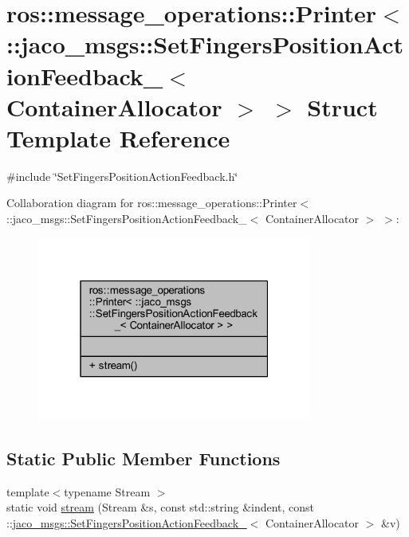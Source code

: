 \hypertarget{structros_1_1message__operations_1_1Printer_3_01_1_1jaco__msgs_1_1SetFingersPositionActionFeedbae13e05216e53f9116f074ec65036b29d}{}\section{ros\+:\+:message\+\_\+operations\+:\+:Printer$<$ \+:\+:jaco\+\_\+msgs\+:\+:Set\+Fingers\+Position\+Action\+Feedback\+\_\+$<$ Container\+Allocator $>$ $>$ Struct Template Reference}
\label{structros_1_1message__operations_1_1Printer_3_01_1_1jaco__msgs_1_1SetFingersPositionActionFeedbae13e05216e53f9116f074ec65036b29d}


{\ttfamily \#include \char`\"{}Set\+Fingers\+Position\+Action\+Feedback.\+h\char`\"{}}



Collaboration diagram for ros\+:\+:message\+\_\+operations\+:\+:Printer$<$ \+:\+:jaco\+\_\+msgs\+:\+:Set\+Fingers\+Position\+Action\+Feedback\+\_\+$<$ Container\+Allocator $>$ $>$\+:
\nopagebreak
\begin{figure}[H]
\begin{center}
\leavevmode
\includegraphics[width=256pt]{d5/dd6/structros_1_1message__operations_1_1Printer_3_01_1_1jaco__msgs_1_1SetFingersPositionActionFeedba2f3e936c70ee7f75b8b8b31f2ccfb296}
\end{center}
\end{figure}
\subsection*{Static Public Member Functions}
\begin{DoxyCompactItemize}
\item 
{\footnotesize template$<$typename Stream $>$ }\\static void \hyperlink{structros_1_1message__operations_1_1Printer_3_01_1_1jaco__msgs_1_1SetFingersPositionActionFeedbae13e05216e53f9116f074ec65036b29d_a96850af8444a36a39e34d1da71d282e2}{stream} (Stream \&s, const std\+::string \&indent, const \+::\hyperlink{structjaco__msgs_1_1SetFingersPositionActionFeedback__}{jaco\+\_\+msgs\+::\+Set\+Fingers\+Position\+Action\+Feedback\+\_\+}$<$ Container\+Allocator $>$ \&v)
\end{DoxyCompactItemize}


